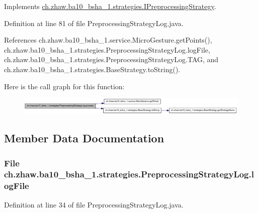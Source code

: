 Implements \hyperlink{interfacech_1_1zhaw_1_1ba10__bsha__1_1_1strategies_1_1IPreprocessingStrategy_a3e3885dce8fda7b79dc514078f11ad62}{ch.zhaw.ba10\_\-bsha\_\-1.strategies.IPreprocessingStrategy}.

Definition at line 81 of file PreprocessingStrategyLog.java.

References ch.zhaw.ba10\_\-bsha\_\-1.service.MicroGesture.getPoints(), ch.zhaw.ba10\_\-bsha\_\-1.strategies.PreprocessingStrategyLog.logFile, ch.zhaw.ba10\_\-bsha\_\-1.strategies.PreprocessingStrategyLog.TAG, and ch.zhaw.ba10\_\-bsha\_\-1.strategies.BaseStrategy.toString().

Here is the call graph for this function:\nopagebreak
\begin{figure}[H]
\begin{center}
\leavevmode
\includegraphics[width=420pt]{classch_1_1zhaw_1_1ba10__bsha__1_1_1strategies_1_1PreprocessingStrategyLog_a4a22fc4b981ca9898e730579f93744fe_cgraph}
\end{center}
\end{figure}


\subsection{Member Data Documentation}
\hypertarget{classch_1_1zhaw_1_1ba10__bsha__1_1_1strategies_1_1PreprocessingStrategyLog_a369993f5c6a751d5915b0afceaf930b5}{
\subsubsection[{logFile}]{\setlength{\rightskip}{0pt plus 5cm}File {\bf ch.zhaw.ba10\_\-bsha\_\-1.strategies.PreprocessingStrategyLog.logFile}}}
\label{classch_1_1zhaw_1_1ba10__bsha__1_1_1strategies_1_1PreprocessingStrategyLog_a369993f5c6a751d5915b0afceaf930b5}


Definition at line 34 of file PreprocessingStrategyLog.java.

